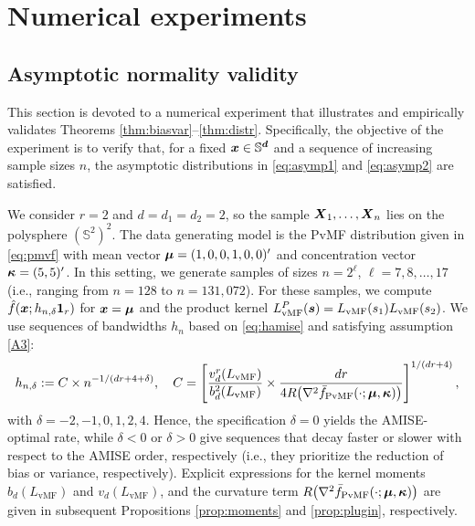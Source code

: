 \documentclass[oneside,11pt]{article}
\begin{document}
\section{Numerical experiments}
\label{sec:num}

\subsection{Asymptotic normality validity}

This section is devoted to a numerical experiment that illustrates and empirically validates Theorems \ref{thm:biasvar}--\ref{thm:distr}. Specifically, the objective of the experiment is to verify that, for a fixed $\boldsymbol{x}\in\mathbb{S}^{\boldsymbol{d}}$ and a sequence of increasing sample sizes $n$, the asymptotic distributions in \eqref{eq:asymp1} and \eqref{eq:asymp2} are satisfied.

We consider $r=2$ and $d=d_1=d_2=2$, so the sample $\boldsymbol{X}_1,\ldots,\boldsymbol{X}_n$ lies on the polysphere $(\mathbb{S}^2)^2$. The data generating model is the PvMF distribution given in \eqref{eq:pmvf} with mean vector $\boldsymbol\mu=(1,0,0,1,0,0)'$ and concentration vector $\boldsymbol\kappa=(5,5)'$. In this setting, we generate samples of sizes $n=2^\ell$, $\ell=7,8,\ldots,17$ (i.e., ranging from $n=128$ to $n=131,\!072$). For these samples, we compute $\hat{f}(\boldsymbol{x};h_{n,\delta}\mathbf{1}_r )$ for $\boldsymbol{x}=\boldsymbol\mu$ and the product kernel $L_\mathrm{vMF}^P(\boldsymbol{s})= L_\mathrm{vMF}(s_1)L_\mathrm{vMF}(s_2)$. We use sequences of bandwidths $h_n$ based on \eqref{eq:hamise} and satisfying assumption \ref{A3}:
\begin{align*}
    h_{n,\delta}:= C\times n^{-1/(dr+4+\delta)},\quad C=\left[\frac{v^r_d(L_{\mathrm{vMF}})}{b^{2}_d(L_{\mathrm{vMF}})}\times\frac{dr}{4R\big(\nabla^2 \bar{f}_{\mathrm{PvMF}}(\cdot;\boldsymbol\mu,\boldsymbol\kappa)\big)}\right]^{1/(dr+4)},
\end{align*}
with $\delta=-2,-1,0,1,2,4$. Hence, the specification $\delta=0$ yields the AMISE-optimal rate, while $\delta<0$ or $\delta>0$ give sequences that decay faster or slower with respect to the AMISE order, respectively (i.e., they prioritize the reduction of bias or variance, respectively). Explicit expressions for the kernel moments $b_d(L_{\mathrm{vMF}})$ and $v_d(L_{\mathrm{vMF}})$, and the curvature term $R\big(\nabla^2 \bar{f}_{\mathrm{PvMF}}(\cdot;\boldsymbol\mu,\boldsymbol\kappa)\big)$ are given in subsequent Propositions \ref{prop:moments} and \ref{prop:plugin}, respectively.
\end{document}
